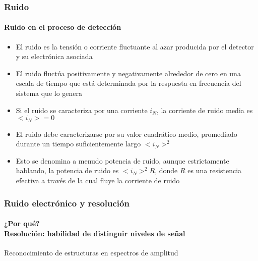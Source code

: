 \documentclass{beamer}
\begin{document}
\begin{frame}
\frametitle{Ruido}
\framesubtitle{Ruido en el proceso de detecci\'on}
\begin{itemize}
\item El ruido es la \alert{tensi\'on o corriente fluctuante al azar} producida por el
detector y su electr\'onica asociada
\item El ruido fluct\'ua positivamente y negativamente alrededor de cero en una
escala de tiempo que est\'a determinada por la respuesta en frecuencia del sistema
que lo genera
\item Si el ruido se caracteriza por una corriente $i_N$, la corriente de ruido
media es $<\!i_N\!> = 0$
\item El ruido debe caracterizarse por su valor cuadr\'atico medio, promediado
durante un tiempo suficientemente largo \alert{$<\!i_N\!>^2$}
\item Esto se denomina a menudo {\color{blue}potencia de ruido}, aunque estrictamente
hablando, la potencia de ruido es \alert{$<\!i_N\!>^2 R$}, donde $R$ es una
{\color{blue}resistencia efectiva} a trav\'es de la cual fluye la corriente de ruido
\end{itemize}
\end{frame} 


\begin{frame}
\frametitle{Ruido electr\'onico y resoluci\'on}
\framesubtitle{¿Por qu\'e? \\ Resoluci\'on: habilidad de distinguir niveles de señal}
{\color{blue}Reconocimiento de estructuras en espectros de amplitud}
\begin{center}
\end{center}
\end{frame} 
\end{document}
